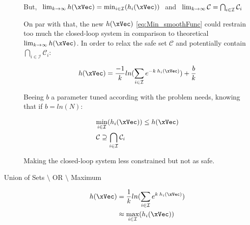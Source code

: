 \begin{description}
    But, \(\hspace{0.4em} \lim_{k \to \infty} h(\xVec) = {\min}_{i \in \mathcal{I}} (h_i(\xVec)) \hspace{0.4em}\) and \( \hspace{0.4em} \lim_{k \to \infty} \mathcal{C} = \bigcap_{i \in \mathcal{I}} \mathcal{C}_i\) \par

    On par with that, the new  \(h(\xVec)\) \ref{eq:Min_smoothFunc} could restrain too much the closed-loop system in comparison to theoretical  \( \lim_{k \to \infty} h(\xVec)\). In order to relax the safe set \(\mathcal{C}\) and potentially contain \( \bigcap_{i \in \mathcal{I}} \mathcal{C}_i\): 
    
    \begin{equation}
        h(\xVec) = \frac{-1}{k}ln(\sum_{i \in \mathcal{I}} e^{-k \hspace{0.2em} h_i(\xVec)}) + \frac{b}{k}
        \label{eq:Min_smoothFunc_tighted} \\  
    \end{equation}



    Beeing \(b\) a parameter tuned according with the problem needs, knowing that if \(b = ln (N)\):

    \begin{subequations}
        \begin{align}
            &\underset{i \in \mathcal{I}}{\min} (h_i(\xVec)) \leq h(\xVec) %
            \label{eq:Intersection_CBF_Comparation_tighted} \\
            &\mathcal{C} \supseteq \bigcap_{i \in \mathcal{I}} \mathcal{C}_i
            \label{eq:Intersection_SafeSet_Comparation_tighted}
        \end{align}
    \end{subequations}

    Making the closed-loop system less constrained but not as safe.

    \item[Union of Sets \(\setminus\) OR \(\setminus\) Maximum]

    \begin{align}
        h(\xVec) &= \frac{1}{k}ln(\sum_{i \in \mathcal{I}} e^{k \hspace{0.2em} h_i(\xVec)}) 
        \label{eq:Max_smoothFunc} \\
                 &\approx \underset{i \in \mathcal{I}}{\max} (h_i(\xVec))
        \notag  
    \end{align}


\end{description}
